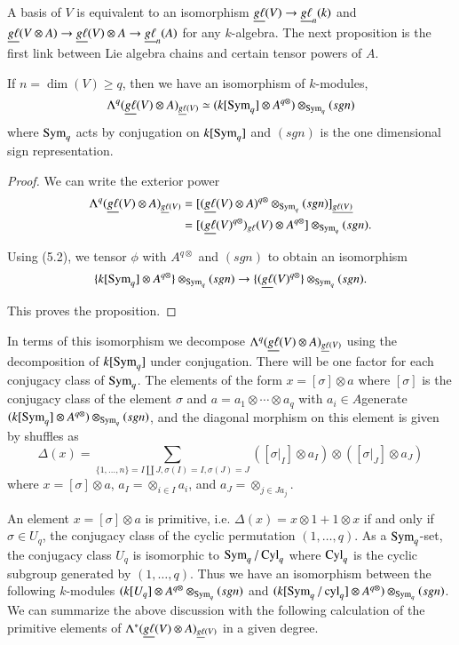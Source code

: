 A basis of $V$ is equivalent to an isomorphism $\underline{g\ell}(V)\to
\underline{g\ell}_{n}(k)$ and $\underline{g\ell}(V\otimes A)\to \underline{g\ell}(V)\otimes
A\to \underline{g\ell}_{n}(A)$ for any $k$-algebra. The next proposition is
the first link between Lie algebra chains and certain tensor powers of
$A$.

\begin{proposition}\label{chap4-prop5.3}
If $n=\dim(V)\geq q$, then we have an isomorphism of $k$-modules,
$$
\Lambda^{q}(\underline{g\ell}(V)\otimes A)_{\underline{g\ell}(V)}\simeq
(k[\operatorname{Sym}_{q}]\otimes A^{q\otimes})\otimes_{\operatorname{Sym}_{q}}(sgn)
$$
where $\operatorname{Sym}_{q}$ acts by conjugation on $k[\operatorname{Sym}_{q}]$ and $(sgn)$ is
the one dimensional sign representation.
\end{proposition}

\begin{proof}
We can write the exterior power
\begin{align*}
\Lambda^{q}(\underline{g\ell}(V)\otimes A)_{\underline{g\ell}(V)} &=
       [(\underline{g\ell}(V)\otimes
         A)^{q\otimes}\otimes_{\operatorname{Sym}_{q}}(sgn)]_{\underline{g\ell(V)}}\\ 
&= [(\underline{g\ell}(V)^{q\otimes})_{g\ell}(V)\otimes
         A^{q\otimes}]\otimes_{\operatorname{Sym}_{q}}(sgn). 
\end{align*}

Using (5.2), we tensor $\phi$ with $A^{q\otimes}$ and $(sgn)$ to
obtain an isomorphism
$$
\{k[\operatorname{Sym}_{q}]\otimes A^{q\otimes}\}\otimes_{\operatorname{Sym}_{q}}(sgn)\to
\{(\underline{g\ell}(V)^{q\otimes}\}\otimes_{\operatorname{Sym}_{q}}(sgn). 
$$

This proves the proposition.
\end{proof}


In terms of this isomorphism we decompose
$\Lambda^{q}(\underline{g\ell}(V)\otimes A)_{\underline{g\ell}(V)}$ using the
decomposition of $k[\operatorname{Sym}_{q}]$ under conjugation. There will be one
factor for each conjugacy class of $\operatorname{Sym}_{q}$. The elements of the
form $x=[\sigma]\otimes a$ where $[\sigma]$ is the conjugacy class of
the element $\sigma$ and $a=a_{1}\otimes \cdots\otimes a_{q}$ with
$a_{i}\in A$\pageoriginale generate $(k[\operatorname{Sym}_{q}]\otimes
A^{q\otimes})\otimes_{\operatorname{Sym}_{q}}(sgn)$, and the diagonal morphism on
this element is given by shuffles as
$$
\Delta(x)=\sum\limits_{\{1,\ldots,n\}=I\coprod
  J,\sigma(I)=I,\sigma(J)=J}([\sigma|_{I}]\otimes
a_{I})\otimes([\sigma|_{J}]\otimes a_{J})
$$
where $x=[\sigma]\otimes a$, $a_{I}=\otimes_{i\in I}a_{i}$, and
$a_{J}=\otimes_{j\in Ja_{j}}$. 

\begin{remark}\label{chap4-rem5.4}
An element $x=[\sigma]\otimes a$ is primitive, i.e.\@
$\Delta(x)=x\otimes 1+1\otimes x$ if and only if $\sigma\in U_{q}$,
the conjugacy class of the cyclic permutation $(1,\ldots,q)$. As a
$\operatorname{Sym}_{q}$-set, the conjugacy class $U_{q}$ is isomorphic to
$\operatorname{Sym}_{q}/\operatorname{Cyl}_{q}$ where $\operatorname{Cyl}_{q}$ is the cyclic subgroup generated
by $(1,\ldots,q)$. Thus we have an isomorphism between the following
$k$-modules $(k[U_{q}]\otimes A^{q\otimes}\otimes_{\operatorname{Sym}_{q}}(sgn)$ and
$(k[\operatorname{Sym}_{q}/\operatorname{cyl}_{q}]\otimes
A^{q\otimes})\otimes_{\operatorname{Sym}_{q}}(sgn)$. We can summarize the above
discussion with the following calculation of the primitive elements of
$\Lambda^{*}(\underline{g\ell}(V)\otimes A)_{\underline{g\ell}(V)}$ in a given degree.
\end{remark}

